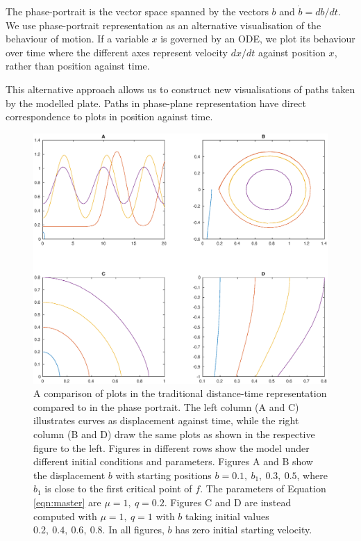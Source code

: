 \documentclass{article}
\begin{document}

The phase-portrait is the vector space spanned by the vectors $b$ and $\dot{b}=db/dt$.
We use phase-portrait representation as an alternative visualisation of the behaviour of motion. If a variable $x$ is governed by an ODE,
we plot its behaviour over time where the different axes represent velocity $dx/dt$ against position $x$,
rather than position against time.

This alternative approach allows us to construct new visualisations of paths taken by the modelled plate.
Paths in phase-plane representation have direct correspondence to plots in position against time.


\begin{figure}
    \centering
    \includegraphics[width=\linewidth]{quadplot_phaseplane_versus_time_2}
    \caption{
        A comparison of plots in the traditional distance-time representation compared to in the phase portrait.
        The left column (A and C) illustrates curves as displacement against time, while the right column (B and D) draw the same plots as shown in the respective figure to the left.
        Figures in different rows show the model under different initial conditions and parameters.
        Figures A and B show the displacement $b$ with starting positions $b=0.1,~b_1,~0.3,~0.5$,
        where $b_1$ is close to the first critical point of $f$. The parameters of Equation \ref{eqn:master} are $\mu=1,~q=0.2$.
        Figures C and D are instead computed with $\mu=1,~q=1$ with $b$ taking initial values $0.2,~0.4,~0.6,~0.8$.
        In all figures, $b$ has zero initial starting velocity.
    }
    \label{fig:phaseportrait_compare}
\end{figure}
\end{document}
